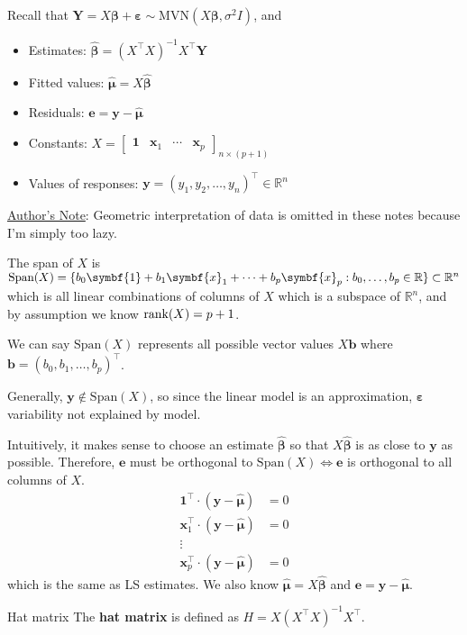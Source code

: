Recall that $ \symbf{Y}=X\symbf{\beta}+\symbf{\varepsilon}
    \sim \text{MVN}(X\symbf{\beta},\sigma^2 I) $, and
\begin{itemize}
    \item Estimates: $ \hat{\symbf{\beta}}=(X^\top X)^{-1}X^\top \symbf{Y} $
    \item Fitted values: $ \hat{\symbf{\mu}}=X\hat{\symbf{\beta}} $
    \item Residuals: $ \symbf{e}=\symbf{y}-\hat{\symbf{\mu}} $
    \item Constants: $ X=\begin{bmatrix}
                  \symbf{1} & \symbf{x}_1 & \cdots & \symbf{x}_p
              \end{bmatrix}_{n\times(p+1)} $
    \item Values of responses: $
              \symbf{y}=(y_1,y_2,\ldots,y_n)^\top \in\mathbb{R}^n $
\end{itemize}
\underline{Author's Note}: Geometric interpretation of data is omitted in these notes because
I'm simply too lazy.

The span of $ X $ is $ \text{Span}(X)=
    \set{b_0\symbf{1}+b_1\symbf{x}_1+\cdots+b_p\symbf{x}_p:b_0,\ldots,b_p\in\mathbb{R}}
    \subset \mathbb{R}^n $
which is all linear combinations of columns of $ X $ which is a subspace
of $ \mathbb{R}^n $, and by assumption we know $ \operatorname{rank}(X)=p+1 $.

We can say $ \text{Span}(X) $ represents all possible vector
values $ X\symbf{b} $ where $ \symbf{b}=(b_0,b_1,\ldots,b_p)^\top $.

Generally, $ \symbf{y}\notin\text{Span}(X) $, so since
the linear model is an approximation, $ \symbf{\varepsilon} $
variability not explained by model.

Intuitively, it makes sense to choose an estimate
$ \hat{\symbf{\beta}} $ so that $ X\hat{\symbf{\beta}} $
is as close to $ \symbf{y} $ as possible. Therefore,
$ \symbf{e} $ must be orthogonal to $ \text{Span}(X)
    \iff \symbf{e} $ is orthogonal to all columns of $ X $.
\begin{align*}
    \symbf{1}^\top\cdot(\symbf{y}-\hat{\symbf{\mu}})   & =      0 \\
    \symbf{x}_1^\top\cdot(\symbf{y}-\hat{\symbf{\mu}}) & =      0 \\
    \vdots                                                        \\
    \symbf{x}_p^\top\cdot(\symbf{y}-\hat{\symbf{\mu}}) & =      0
\end{align*}
which is the same as LS estimates. We also know
$ \hat{\symbf{\mu}}=X\hat{\symbf{\beta}} $ and
$ \symbf{e}=\symbf{y}-\hat{\symbf{\mu}} $.
\begin{Definition}{Hat matrix}{}
    The \textbf{hat matrix} is defined as
    $ H=X(X^\top X)^{-1}X^{\top} $.
\end{Definition}

